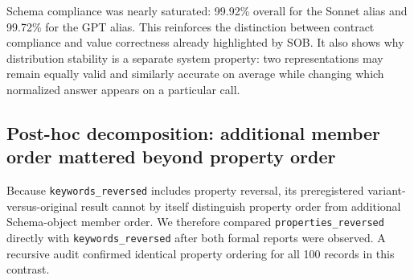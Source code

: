 \documentclass[10pt]{article}
\begin{document}
\begin{table}[t]
\caption{Primary-study quality metrics by representation.}
\label{tab:markdown-4}
\centering
{}
\end{table}
Schema compliance was nearly saturated: 99.92\% overall for the Sonnet alias and 99.72\% for the GPT alias. This reinforces the distinction between contract compliance and value correctness already highlighted by SOB. It also shows why distribution stability is a separate system property: two representations may remain equally valid and similarly accurate on average while changing which normalized answer appears on a particular call.

\subsection{Post-hoc decomposition: additional member order mattered beyond property order}
Because \texttt{keywords\_reversed} includes property reversal, its preregistered variant-versus-original result cannot by itself distinguish property order from additional Schema-object member order. We therefore compared \texttt{properties\_reversed} directly with \texttt{keywords\_reversed} after both formal reports were observed. A recursive audit confirmed identical property ordering for all 100 records in this contrast.
\end{document}
